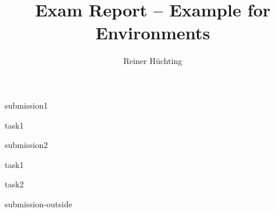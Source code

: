 \documentclass[a4paper]{scrartcl}
\begin{document}
    \title{Exam Report -- Example for Environments}
    \author{Reiner Hüchting}

    \maketitle

    \begin{examreport}[submissions]
        \begin{submissionreport}{submission1}
            \begin{taskreport}{task1}
            \end{taskreport}
        \end{submissionreport}
        \begin{submissionreport}{submission2}
            \begin{taskreport}{task1}
            \end{taskreport}
            \begin{taskreport}{task2}
            \end{taskreport}
        \end{submissionreport}
    \end{examreport}

    \begin{submissionreport}{submission-outside}
    \end{submissionreport}
\end{document}
